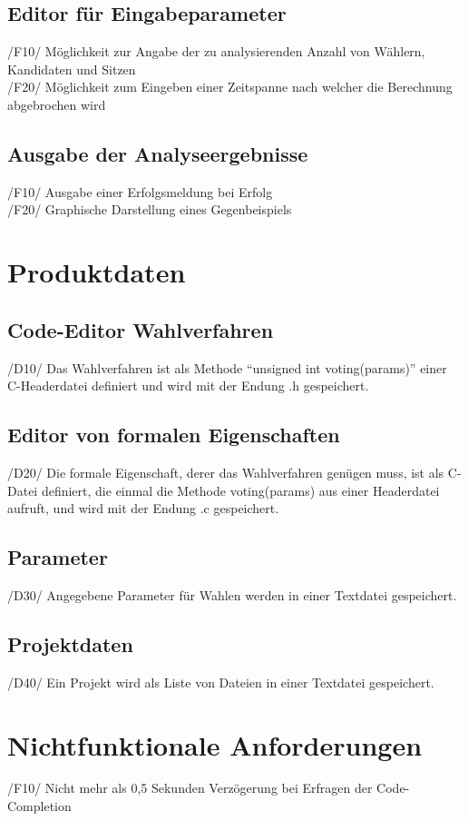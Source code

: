 \documentclass[a4paper]{scrreprt}
\begin{document}
\section{Editor für Eingabeparameter}
/F10/ Möglichkeit zur Angabe der zu analysierenden Anzahl von Wählern, Kandidaten und Sitzen \\
/F20/ Möglichkeit zum Eingeben einer Zeitspanne nach welcher die Berechnung abgebrochen wird \\

\section{Ausgabe der Analyseergebnisse}
/F10/ Ausgabe einer Erfolgsmeldung bei Erfolg \\
/F20/ Graphische Darstellung eines Gegenbeispiels \\

\chapter{Produktdaten}
\section{Code-Editor Wahlverfahren}
/D10/ Das Wahlverfahren ist als Methode "`unsigned int voting(params)"' einer C-Headerdatei definiert und wird mit der Endung .h gespeichert.

\section{Editor von formalen Eigenschaften}
/D20/ Die formale Eigenschaft, derer das Wahlverfahren genügen muss, ist als C-Datei definiert, die einmal die Methode voting(params) aus einer Headerdatei aufruft, und wird mit der Endung .c gespeichert.

\section{Parameter}
/D30/ Angegebene Parameter für Wahlen werden in einer Textdatei gespeichert.

\section{Projektdaten}
/D40/ Ein Projekt wird als Liste von Dateien in einer Textdatei gespeichert.


\chapter{Nichtfunktionale Anforderungen}
/F10/ Nicht mehr als 0,5 Sekunden Verzögerung bei Erfragen der Code-Completion
\end{document}

